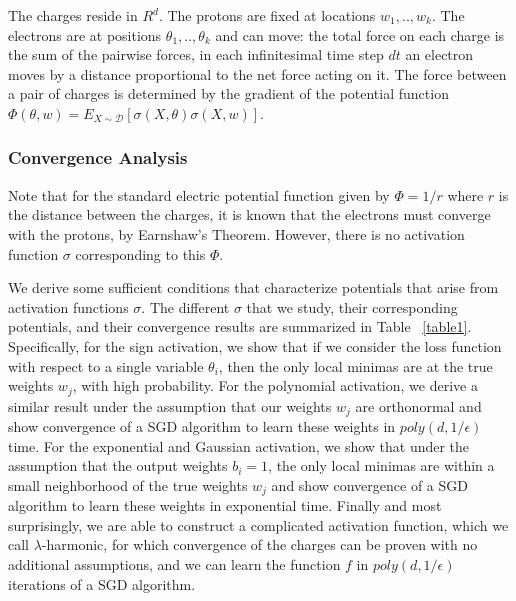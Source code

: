 \documentclass{article}
\begin{document}
The charges reside in $R^d$. The protons are fixed at locations $w_1,..,w_k$. The electrons are at positions $\theta_1,..,\theta_k$ and can move: the total force on each charge is the sum of the pairwise forces, in each infinitesimal time step $dt$ an electron moves by a distance proportional to the net force acting on it. The force between a pair of charges is determined by the gradient of the potential function $\Phi(\theta, w) = E_{X\sim \mathcal{D}}[ \sigma(X,\theta) \sigma(X,w)]$.  

\subsubsection{Convergence Analysis}

Note that for the standard electric potential function given by $\Phi = 1/r$ where $r$ is the distance between the charges, it is known that the electrons must converge with the protons, by Earnshaw's Theorem. However, there is no activation function $\sigma$ corresponding to this $\Phi$. 

We derive some sufficient conditions that characterize potentials that arise from activation functions $\sigma$. The different $\sigma$ that we study, their corresponding potentials, and their convergence results are summarized in Table ~\ref{table1}. Specifically, for the sign activation, we show that if we consider the loss function with respect to a single variable $\theta_i$, then the only local minimas are at the true weights $w_j$, with high probability. For the polynomial activation, we derive a similar result under the assumption that our weights $w_j$ are orthonormal and show convergence of a SGD algorithm to learn these weights in $poly(d,1/\epsilon)$ time. For the exponential and Gaussian activation, we show that under the assumption that the output weights $b_i = 1$, the only local minimas are within a small neighborhood of the true weights $w_j$ and show convergence of a SGD algorithm to learn these weights in exponential time. Finally and most surprisingly, we are able to construct a complicated activation function, which we call $\lambda$-harmonic, for which convergence of the charges can be proven with no additional assumptions, and we can learn the function $f$ in $poly(d,1/\epsilon)$ iterations of a SGD algorithm.
\end{document}
